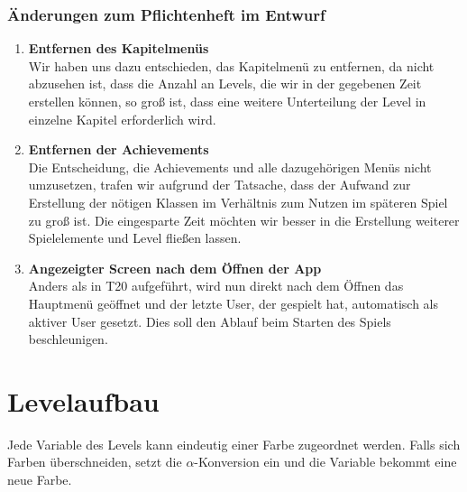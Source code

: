 \documentclass[11pt,a4paper]{report}
\begin{document}
\subsection{Änderungen zum Pflichtenheft im Entwurf}
\begin{enumerate}
	\item {\textbf{Entfernen des Kapitelmenüs}}\\
		Wir haben uns dazu entschieden, das Kapitelmenü zu entfernen, da nicht abzusehen ist, dass die Anzahl an Levels, die wir in der gegebenen Zeit erstellen können, so groß ist, dass eine weitere Unterteilung der Level in einzelne Kapitel erforderlich wird.
	\item {\textbf{Entfernen der Achievements}}\\
		Die Entscheidung, die Achievements und alle dazugehörigen Menüs nicht umzusetzen, trafen wir aufgrund der Tatsache, dass der Aufwand zur Erstellung der nötigen Klassen im Verhältnis zum Nutzen im späteren Spiel zu groß ist. Die eingesparte Zeit möchten wir besser in die Erstellung weiterer Spielelemente und Level fließen lassen.
	\item {\textbf{Angezeigter Screen nach dem Öffnen der App}}\\
		 Anders als in T20 aufgeführt, wird nun direkt nach dem Öffnen das Hauptmenü geöffnet und der letzte User, der gespielt hat, automatisch als aktiver User gesetzt. Dies soll den Ablauf beim Starten des Spiels beschleunigen. 
\end{enumerate}
\clearpage

\chapter{Levelaufbau}

Jede Variable des Levels kann eindeutig einer Farbe zugeordnet werden. Falls sich Farben überschneiden, setzt die $\alpha$-Konversion ein und die Variable bekommt eine neue Farbe.\\
\end{document}
